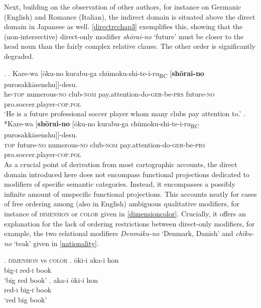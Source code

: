 \documentclass [output=book,colorlinks,citecolor=brown]{langscibook}
\begin{document}
Next, building on the observation of other authors, for instance \citet{cinque:2010:adj} on Germanic (English) and Romance (Italian), the indirect domain is situated above the direct domain in Japanese as well. \ref{directrcchap3} exemplifies this, showing that the (non-intersective) direct-only modifier \textit{shōrai-no} `future’ must be closer to the head noun than the fairly complex relative clause. The other order is significantly degraded. %

\ex. \label{directrcchap3} \ag. Kare-wa [ōku-no kurabu-ga chūmoku-shi-te-i-ru\textsubscript{RC} [\textbf{shōrai-no} purosakkāsenshu]]-desu.\\
he-\textsc{top} numerous-\textsc{no} club-\textsc{nom} pay.attention-do-\textsc{ger}-be-\textsc{prs} future-\textsc{no} pro.soccer.player-\textsc{cop.pol}\\
`He is a future professional soccer player whom many clubs pay attention to.’
\bg. *Kare-wa [\textbf{shōrai-no} [ōku-no kurabu-ga chūmoku-shi-te-i-ru\textsubscript{RC} purosakkāsenshu]]-desu.\\
\textsc{top} future-\textsc{no} numerous-\textsc{no} club-\textsc{nom} pay.attention-do-\textsc{ger}-be-\textsc{prs} pro.soccer.player-\textsc{cop.pol}\\

As a crucial point of derivation from most cartographic accounts, the direct domain introduced here does not encompass functional projections dedicated to modifiers of specific semantic categories. Instead, it encompasses a possibly infinite amount of unspecific functional projections. This accounts neatly for cases of free ordering among (also in English) ambiguous qualitative modifiers, for instance of \textsc{dimension} or \textsc{color} given in \ref{dimensioncolor}. Crucially, it offers an explanation for the lack of ordering restrictions between direct-only modifiers, for example, the two relational modifiers \textit{Denmāku-no} `Denmark, Danish’ and \textit{chīku-no} `teak’ given in \ref{nationality}. %


\ex. \textsc{dimension} vs \textsc{color} \label{dimensioncolor}
\ag. ōki-i aka-i hon\\
big-\textsc{i} red-\textsc{i} book\\
`big red book’
\bg. aka-i ōki-i hon\\
red-\textsc{i} big-\textsc{i} book\\
`red big book’
\end{document}

